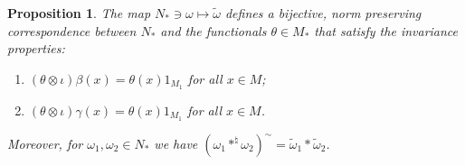 \documentclass[11pt]{article}
\numberwithin{equation}{section}
\newtheorem{prop}[thm]{Proposition}
\theoremstyle{definition}
\begin{document}
\begin{prop}\label{PropInvariance}
 The map $N_\ast \ni \omega \mapsto \tilde{\omega}$ defines a bijective, norm preserving correspondence between $N_\ast$ and the   functionals $\theta \in M_\ast$ that satisfy the invariance properties:
\begin{enumerate}\itemsep=0pt
 \item\label{LemInvarianceI} $(\theta \otimes \iota) \beta(x) = \theta(x) 1_{M_1}$ for all $x \in M$;
\item\label{LemInvarianceII} $(\theta \otimes \iota) \gamma(x) = \theta(x) 1_{M_1}$ for all $x \in M$.
\end{enumerate}
Moreover, for $\omega_1, \omega_2 \in N_\ast$ we have $ \left( \omega_1 \ast^\natural \omega_2 \right)^\sim = \tilde{\omega}_1 \ast \tilde{\omega}_2$.
\end{prop}
\end{document}
